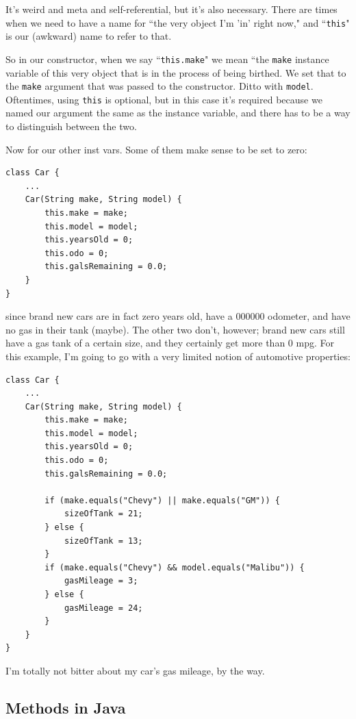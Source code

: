 It's weird and meta and self-referential, but it's also necessary. There are
times when we need to have a name for ``the very object I'm 'in' right now,"
and ``\texttt{this}" is our (awkward) name to refer to that.

So in our constructor, when we say ``\texttt{this.make}" we mean ``the
\texttt{make} instance variable of this very object that is in the process of
being birthed. We set that to the \texttt{make} argument that was passed to
the constructor. Ditto with \texttt{model}. Oftentimes, using \texttt{this} is
optional, but in this case it's required because we named our argument the
same as the instance variable, and there has to be a way to distinguish
between the two.

Now for our other inst vars. Some of them make sense to be set to zero:

\begin{Verbatim}[samepage=true,fontsize=\footnotesize,frame=single]
class Car {
    ...
    Car(String make, String model) {
        this.make = make;
        this.model = model;
        this.yearsOld = 0;
        this.odo = 0;
        this.galsRemaining = 0.0;
    }
}
\end{Verbatim}

since brand new cars are in fact zero years old, have a 000000 odometer, and
have no gas in their tank (maybe). The other two don't, however; brand new
cars still have a gas tank of a certain size, and they certainly get more than
0 mpg. For this example, I'm going to go with a very limited notion of
automotive properties:

\begin{Verbatim}[samepage=true,fontsize=\footnotesize,frame=single]
class Car {
    ...
    Car(String make, String model) {
        this.make = make;
        this.model = model;
        this.yearsOld = 0;
        this.odo = 0;
        this.galsRemaining = 0.0;
        
        if (make.equals("Chevy") || make.equals("GM")) {
            sizeOfTank = 21;
        } else {
            sizeOfTank = 13;
        }
        if (make.equals("Chevy") && model.equals("Malibu")) {
            gasMileage = 3;
        } else {
            gasMileage = 24;
        }
    }
}
\end{Verbatim}

I'm totally not bitter about my car's gas mileage, by the way.

\subsection{Methods in Java}

